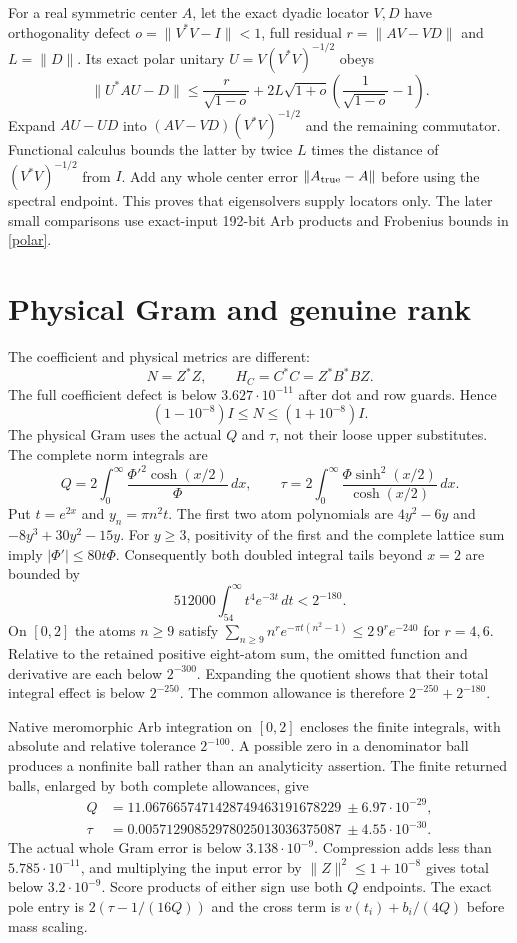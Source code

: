 \documentclass[11pt]{article}
\newcommand{\dd}{\,d}
\numberwithin{equation}{section}
\begin{document}
For a real symmetric center $A$, let the exact dyadic locator $V,D$
have orthogonality defect $o=\|V^*V-I\|<1$, full residual
$r=\|AV-VD\|$ and $L=\|D\|$. Its exact polar unitary
$U=V(V^*V)^{-1/2}$ obeys
\begin{equation}\label{polar}
 \|U^*AU-D\|\le\frac r{\sqrt{1-o}}
 +2L\sqrt{1+o}\left(\frac1{\sqrt{1-o}}-1\right).
\end{equation}
Expand $AU-UD$ into $(AV-VD)(V^*V)^{-1/2}$ and the remaining
commutator. Functional calculus bounds the latter by twice $L$
times the distance of $(V^*V)^{-1/2}$ from $I$. Add any whole
center error $\|A_{\rm true}-A\|$ before using the spectral endpoint.
This proves that eigensolvers supply locators only. The later small
comparisons use exact-input 192-bit Arb products and Frobenius bounds
in \eqref{polar}.

\section{Physical Gram and genuine rank}\label{physical}
The coefficient and physical metrics are different:
\[
 N=Z^*Z,\qquad H_C=C^*C=Z^*B^*BZ.
\]
The full coefficient defect is below $3.627\cdot10^{-11}$ after
dot and row guards. Hence
\begin{equation}\label{ngram}
 (1-10^{-8})I\le N\le(1+10^{-8})I.
\end{equation}
The physical Gram uses the actual $Q$ and $\tau$, not their loose
upper substitutes. The complete norm integrals are
\[
 Q=2\int_0^\infty\frac{\Phi'^2\cosh(x/2)}{\Phi}\dd x,
 \qquad \tau=2\int_0^\infty\frac{\Phi\sinh^2(x/2)}{\cosh(x/2)}\dd x.
\]
Put $t=e^{2x}$ and $y_n=\pi n^2t$. The first two atom polynomials
are $4y^2-6y$ and $-8y^3+30y^2-15y$. For $y\ge3$, positivity of
the first and the complete lattice sum imply
$|\Phi'|\le80t\Phi$. Consequently both doubled integral tails
beyond $x=2$ are bounded by
\[
 512000\int_{54}^\infty t^4e^{-3t}\dd t<2^{-180}.
\]
On $[0,2]$ the atoms $n\ge9$ satisfy
$\sum_{n\ge9}n^re^{-\pi t(n^2-1)}\le2\,9^re^{-240}$ for $r=4,6$.
Relative to the retained positive eight-atom sum, the omitted function
and derivative are each below $2^{-300}$. Expanding the quotient
shows that their total integral effect is below $2^{-250}$.
The common allowance is therefore $2^{-250}+2^{-180}$.

Native meromorphic Arb integration on $[0,2]$ encloses the finite
integrals, with absolute and relative tolerance $2^{-100}$. A possible
zero in a denominator ball produces a nonfinite ball rather than an
analyticity assertion. The finite returned balls, enlarged by both
complete allowances, give
\begin{align*}
 Q&=11.0676657471428749463191678229\ \pm6.97\cdot10^{-29},\\
 \tau&=0.00571290852978025013036375087\ \pm4.55\cdot10^{-30}.
\end{align*}
The actual whole Gram error is below $3.138\cdot10^{-9}$. Compression
adds less than $5.785\cdot10^{-11}$, and multiplying the input error
by $\|Z\|^2\le1+10^{-8}$ gives total below $3.2\cdot10^{-9}$.
Score products of either sign use both $Q$ endpoints. The exact pole
entry is $2(\tau-1/(16Q))$ and the cross term is
$v(t_i)+b_i/(4Q)$ before mass scaling.
\end{document}
